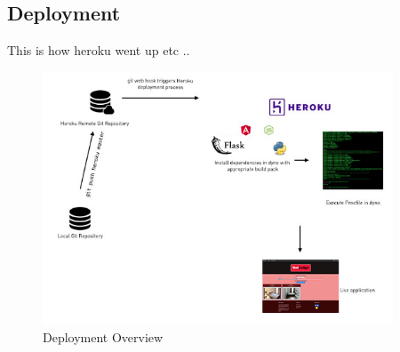 \subsection{Deployment}
This is how heroku went up etc ..


\begin{figure}[H]
	\caption{Deployment Overview}
	\label{image:deploy}
	\centering
	\includegraphics[width=0.93\textwidth]{images/deploy.png}
\end{figure}